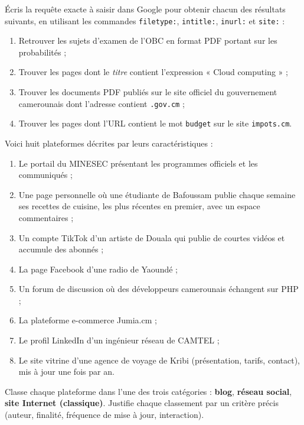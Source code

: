 \documentclass[11pt]{article}
\newcounter{popsec}
\newcounter{popsub}
\newcommand{\courssub}[1]{%
  \stepcounter{popsub}%
  \par\vspace{9pt}\noindent{\popxbold\fontsize{11.5}{13}\selectfont\color{popink}{\color{poporange}\thepopsec.\thepopsub}\hspace{6pt}#1}\par\nopagebreak\vspace{4pt}
}
\begin{document}
\courssub{Je m'entraîne}

\begin{exercice}
Écris la requête exacte à saisir dans Google pour obtenir chacun des résultats suivants, en utilisant les commandes \texttt{filetype:}, \texttt{intitle:}, \texttt{inurl:} et \texttt{site:} :
\begin{enumerate}
    \item Retrouver les sujets d'examen de l'OBC en format PDF portant sur les probabilités ;
    \item Trouver les pages dont le \emph{titre} contient l'expression « Cloud computing » ;
    \item Trouver les documents PDF publiés sur le site officiel du gouvernement camerounais dont l'adresse contient \texttt{.gov.cm} ;
    \item Trouver les pages dont l'URL contient le mot \texttt{budget} sur le site \texttt{impots.cm}.
\end{enumerate}
\end{exercice}

\begin{exercice}
Voici huit plateformes décrites par leurs caractéristiques :
\begin{enumerate}
    \item Le portail du MINESEC présentant les programmes officiels et les communiqués ;
    \item Une page personnelle où une étudiante de Bafoussam publie chaque semaine ses recettes de cuisine, les plus récentes en premier, avec un espace commentaires ;
    \item Un compte TikTok d'un artiste de Douala qui publie de courtes vidéos et accumule des abonnés ;
    \item La page Facebook d'une radio de Yaoundé ;
    \item Un forum de discussion où des développeurs camerounais échangent sur PHP ;
    \item La plateforme e-commerce Jumia.cm ;
    \item Le profil LinkedIn d'un ingénieur réseau de CAMTEL ;
    \item Le site vitrine d'une agence de voyage de Kribi (présentation, tarifs, contact), mis à jour une fois par an.
\end{enumerate}
Classe chaque plateforme dans l'une des trois catégories : \textbf{blog}, \textbf{réseau social}, \textbf{site Internet (classique)}. Justifie chaque classement par un critère précis (auteur, finalité, fréquence de mise à jour, interaction).
\end{exercice}
\end{document}
